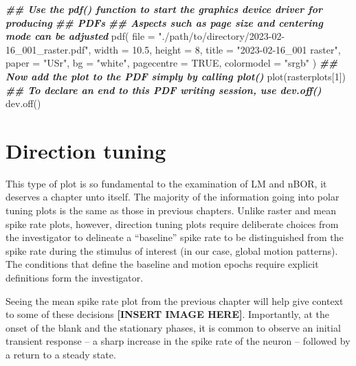 \documentclass[
]{book}
\newenvironment{Shaded}{\begin{snugshade}}{\end{snugshade}}
\newcommand{\AttributeTok}[1]{\textcolor[rgb]{0.77,0.63,0.00}{#1}}
\newcommand{\ConstantTok}[1]{\textcolor[rgb]{0.00,0.00,0.00}{#1}}
\newcommand{\DecValTok}[1]{\textcolor[rgb]{0.00,0.00,0.81}{#1}}
\newcommand{\DocumentationTok}[1]{\textcolor[rgb]{0.56,0.35,0.01}{\textbf{\textit{#1}}}}
\newcommand{\FloatTok}[1]{\textcolor[rgb]{0.00,0.00,0.81}{#1}}
\newcommand{\FunctionTok}[1]{\textcolor[rgb]{0.00,0.00,0.00}{#1}}
\newcommand{\NormalTok}[1]{#1}
\newcommand{\StringTok}[1]{\textcolor[rgb]{0.31,0.60,0.02}{#1}}
\begin{document}
\begin{Shaded}
\begin{Highlighting}[]
\DocumentationTok{\#\# Use the \textasciigrave{}pdf()\textasciigrave{} function to start the graphics device driver for producing}
\DocumentationTok{\#\# PDFs}
\DocumentationTok{\#\# Aspects such as page size and centering mode can be adjusted}
\FunctionTok{pdf}\NormalTok{(}
  \AttributeTok{file =} \StringTok{"./path/to/directory/2023{-}02{-}16\_001\_raster.pdf"}\NormalTok{,}
  \AttributeTok{width =} \FloatTok{10.5}\NormalTok{,}
  \AttributeTok{height =} \DecValTok{8}\NormalTok{,}
  \AttributeTok{title =} \StringTok{"2023{-}02{-}16\_001 raster"}\NormalTok{,}
  \AttributeTok{paper =} \StringTok{"USr"}\NormalTok{,}
  \AttributeTok{bg =} \StringTok{"white"}\NormalTok{,}
  \AttributeTok{pagecentre =} \ConstantTok{TRUE}\NormalTok{,}
  \AttributeTok{colormodel =} \StringTok{"srgb"}
\NormalTok{)}
\DocumentationTok{\#\# Now add the plot to the PDF simply by calling plot()}
\FunctionTok{plot}\NormalTok{(rasterplots[}\DecValTok{1}\NormalTok{])}
\DocumentationTok{\#\# To declare an end to this PDF writing session, use \textasciigrave{}dev.off()\textasciigrave{}}
\FunctionTok{dev.off}\NormalTok{()}
\end{Highlighting}
\end{Shaded}

\hypertarget{direction-tuning}{%
\chapter{Direction tuning}\label{direction-tuning}}

This type of plot is so fundamental to the examination of LM and nBOR,
it deserves a chapter unto itself. The majority of the information
going into polar tuning plots is the same as those in previous
chapters. Unlike raster and mean spike rate plots, however, direction
tuning plots require deliberate choices from the investigator to
delineate a ``baseline'' spike rate to be distinguished from the spike
rate during the stimulus of interest (in our case, global motion
patterns). The conditions that define the baseline and motion epochs
require explicit definitions form the investigator.

Seeing the mean spike rate plot from the previous chapter will help
give context to some of these decisions \textbf{{[}INSERT IMAGE HERE{]}}.
Importantly, at the onset of the blank and the stationary phases, it
is common to observe an initial transient response -- a sharp increase
in the spike rate of the neuron -- followed by a return to a steady
state.
\end{document}
